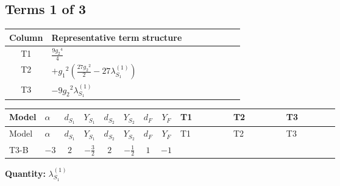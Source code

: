 \documentclass[8pt]{article}
\begin{document}
\begin{landscape}
\subsection*{Terms 1 of 3}
\begin{center}
\begin{tabular}{@{}c >{\raggedright\arraybackslash}p{0.82\linewidth}@{}}
\toprule
Column & Representative term structure \\
\midrule
T1 & \(\displaystyle \frac{9 {g_2}^4}{4}\) \\
\midrule
T2 & \(\displaystyle +{g_1}^2 \left(\frac{27 {g_2}^2}{2}-27 {\lambda_{S_1}^{(1)}}\right)\) \\
\midrule
T3 & \(\displaystyle -9 {g_2}^2 {\lambda_{S_1}^{(1)}}\) \\
\midrule
\bottomrule
\end{tabular}
\end{center}
\smallskip
\tiny
\begin{longtable}{@{}llcccccc >{\raggedright\arraybackslash}p{0.21\linewidth} >{\raggedright\arraybackslash}p{0.21\linewidth} >{\raggedright\arraybackslash}p{0.21\linewidth}@{}}
\toprule
Model & $\alpha$ & $d_{S_1}$ & $Y_{S_1}$ & $d_{S_2}$ & $Y_{S_2}$ & $d_F$ & $Y_F$ & T1 & T2 & T3 \\
\midrule
\endfirsthead
\toprule
Model & $\alpha$ & $d_{S_1}$ & $Y_{S_1}$ & $d_{S_2}$ & $Y_{S_2}$ & $d_F$ & $Y_F$ & T1 & T2 & T3 \\
\midrule
\endhead
T3-B & $-3$ & $2$ & $-\frac{3}{2}$ & $2$ & $-\frac{1}{2}$ & $1$ & $-1$ & \scriptsize\adjustbox{max width=\linewidth}{$\begin{gathered} \frac{9 {g_2}^4}{4}\end{gathered}$} & \scriptsize\adjustbox{max width=\linewidth}{$\begin{gathered} +{g_1}^2 \left(\frac{27 {g_2}^2}{2}-27 {\lambda_{S_1}^{(1)}}\right)\end{gathered}$} & \scriptsize\adjustbox{max width=\linewidth}{$\begin{gathered} -9 {g_2}^2 {\lambda_{S_1}^{(1)}}\end{gathered}$} \\
\midrule
\bottomrule
\end{longtable}
\clearpage
\noindent\textbf{Quantity: }$\lambda_{S_1}^{(1)}$\par\smallskip

\end{landscape}
\end{document}
